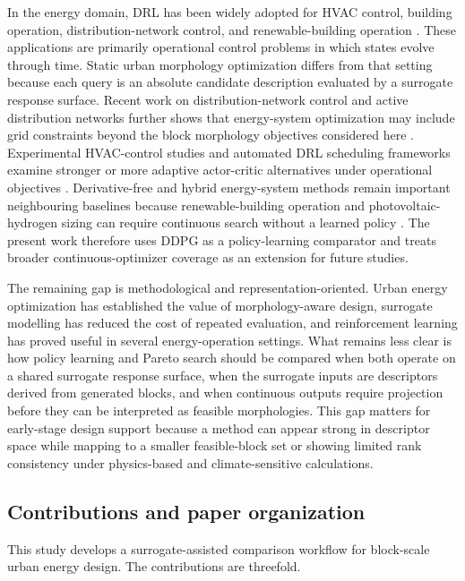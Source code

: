 \documentclass[final,3p,times,numbers,sort&compress]{elsarticle}
\newif\ifshowrevision
\newenvironment{revblock}{%
  \ifshowrevision\color{revisionblue}\fi%
}{}
\begin{document}
\begin{revblock}
In the energy domain, DRL has been widely adopted for HVAC control, building operation, distribution-network control, and renewable-building operation \cite{ref33,ref34}. These applications are primarily operational control problems in which states evolve through time. Static urban morphology optimization differs from that setting because each query is an absolute candidate description evaluated by a surrogate response surface. Recent work on distribution-network control and active distribution networks further shows that energy-system optimization may include grid constraints beyond the block morphology objectives considered here \cite{ref35,ref36}. Experimental HVAC-control studies and automated DRL scheduling frameworks examine stronger or more adaptive actor-critic alternatives under operational objectives \cite{ref37,ref38}. Derivative-free and hybrid energy-system methods remain important neighbouring baselines because renewable-building operation and photovoltaic-hydrogen sizing can require continuous search without a learned policy \cite{ref39,ref40}. The present work therefore uses DDPG as a policy-learning comparator and treats broader continuous-optimizer coverage as an extension for future studies.

The remaining gap is methodological and representation-oriented. Urban energy optimization has established the value of morphology-aware design, surrogate modelling has reduced the cost of repeated evaluation, and reinforcement learning has proved useful in several energy-operation settings. What remains less clear is how policy learning and Pareto search should be compared when both operate on a shared surrogate response surface, when the surrogate inputs are descriptors derived from generated blocks, and when continuous outputs require projection before they can be interpreted as feasible morphologies. This gap matters for early-stage design support because a method can appear strong in descriptor space while mapping to a smaller feasible-block set or showing limited rank consistency under physics-based and climate-sensitive calculations.

\subsection{Contributions and paper organization}

This study develops a surrogate-assisted comparison workflow for block-scale urban energy design. The contributions are threefold.


\end{revblock}
\end{document}

